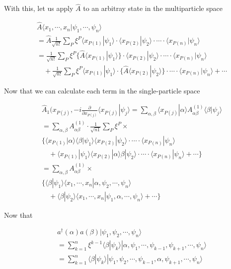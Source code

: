 With this, let us apply $\hat{A}$ to an arbitray state in the multiparticle space

\[\begin{split}
&\hat{A}\langle x_1,\cdots,x_n|\psi_1,\cdots,\psi_n\rangle \\
&=\hat{A}\frac{1}{\sqrt{n!}}\sum_P\xi^P\langle x_{P(1)}|\psi_1\rangle\cdot\langle x_{P(2)}|\psi_2\rangle\cdot\cdots\cdot\langle x_{P(n)}|\psi_n\rangle\\
&=\frac{1}{\sqrt{n!}}\sum_P\xi^P\{\hat{A}\langle x_{P(1)}|\psi_1\rangle\}\cdot\langle x_{P(2)}|\psi_2\rangle\cdot\cdots\cdot\langle x_{P(n)}|\psi_n\rangle \\
&\quad + \frac{1}{\sqrt{n!}}\sum_P\xi^P\langle x_{P(1)}|\psi_1\rangle\cdot\{\hat{A}\langle x_{P(2)}|\psi_2\rangle\}\cdot\cdots\cdot\langle x_{P(n)}|\psi_n\rangle + \cdots
\end{split}\]

Now that we can calculate each term in the single-particle space

\[\begin{split}
&\hat{A}_1(x_{P(j)},-i\frac{\partial}{\partial x_{P(j)}}\langle x_{P(j)}|\psi_j\rangle = \sum_{\alpha,\beta}\langle x_{P(j)}|\alpha\rangle A^{(1)}_{\alpha\beta}\langle\beta|\psi_j\rangle \\
&= \sum_{\alpha,\beta}A^{(1)}_{\alpha\beta}\cdot\frac{1}{\sqrt{n1}}\sum_P\xi^P \times \\
&\Big\{\langle x_{P(1)}|\alpha\rangle\langle\beta|\psi_1\rangle\langle x_{P(2)}|\psi_2\rangle\cdot\cdots\cdot\langle x_{P(n)}|\psi_n\rangle\\
&\quad +\langle x_{P(1)}|\psi_1\rangle\langle x_{P(2)}|\alpha\rangle\beta|\psi_2\rangle\cdot\cdots\cdot\langle x_{P(n)}|\psi_n\rangle + \cdots\Big\}\\
&=\sum_{\alpha,\beta}A_{\alpha\beta}^{(1)}\times\\
&\Big\{\langle\beta|\psi_1\rangle\langle x_1,\cdots,x_n|\alpha,\psi_2,\cdots,\psi_n\rangle\\
&\quad +\langle\beta|\psi_2\rangle\langle x_1,\cdots,x_n|\psi_1,\alpha,\cdots,\psi_n\rangle + \cdots\Big\}
\end{split}\]

Now that

\[\begin{split}
&a^\dagger(\alpha) a(\beta)|\psi_1,\psi_2,\cdots,\psi_n\rangle \\
&= \sum_{k=1}^n\xi^{k-1}\langle \beta|\psi_k\rangle|\alpha,\psi_1,\cdots,\psi_{k-1},\psi_{k+1},\cdots,\psi_n\rangle\\
&=\sum_{k=1}^n\langle\beta|\psi_k\rangle|\psi_1,\psi_2,\cdots,\psi_{k-1},\alpha,\psi_{k+1},\cdots,\psi_n\rangle
\end{split}\]

